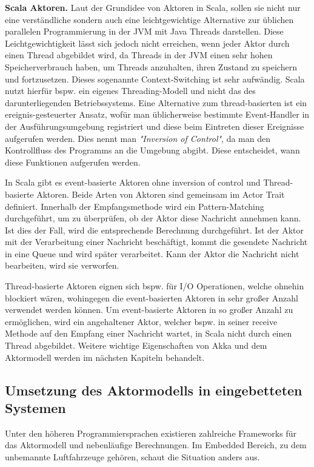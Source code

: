 \textbf{Scala Aktoren.} Laut der Grundidee von Aktoren in Scala, sollen sie nicht nur eine verständliche sondern auch eine leichtgewichtige Alternative zur üblichen parallelen Programmierung in der JVM mit Java Threads darstellen. Diese Leichtgewichtigkeit lässt sich jedoch nicht erreichen, wenn jeder Aktor durch einen Thread abgebildet wird, da Threads in der JVM einen sehr hohen Speicherverbrauch haben, um Threads anzuhalten, ihren Zustand zu speichern und fortzusetzen. Dieses sogenannte Context-Switching ist sehr aufwändig. Scala nutzt hierfür bspw. ein eigenes Threading-Modell und nicht das des darunterliegenden Betriebssystems. Eine Alternative zum thread-basierten ist ein ereignis-gesteuerter Ansatz, wofür man üblicherweise bestimmte Event-Handler in der Ausführungsumgebung registriert und diese beim Eintreten dieser Ereignisse aufgerufen werden. Dies nennt man \textit{"Inversion of Control"}, da man den Kontrollfluss des Programms an die Umgebung abgibt. Diese entscheidet, wann diese Funktionen aufgerufen werden.

In Scala gibt es event-basierte Aktoren ohne inversion of control und Thread-basierte Aktoren. Beide Arten von Aktoren sind gemeinsam im Actor Trait definiert. Innerhalb der Empfangsmethode wird ein Pattern-Matching durchgeführt, um zu überprüfen, ob der Aktor diese Nachricht annehmen kann. Ist dies der Fall, wird die entsprechende Berechnung durchgeführt. Ist der Aktor mit der Verarbeitung einer Nachricht beschäftigt, kommt die gesendete Nachricht in eine Queue und wird später verarbeitet. Kann der Aktor die Nachricht nicht bearbeiten, wird sie verworfen.

Thread-basierte Aktoren eignen sich bspw. für I/O Operationen, welche ohnehin blockiert wären, wohingegen die event-basierten Aktoren in sehr großer Anzahl verwendet werden können. Um event-basierte Aktoren in so großer Anzahl zu ermöglichen, wird ein angehaltener Aktor, welcher bspw. in seiner receive Methode auf den Empfang einer Nachricht wartet, in Scala nicht durch einen Thread abgebildet. Weitere wichtige Eigenschaften von Akka und dem Aktormodell werden im nächsten Kapiteln behandelt.

\subsection{Umsetzung des Aktormodells in eingebetteten Systemen}

Unter den höheren Programmiersprachen existieren zahlreiche Frameworks für das Aktormodell und nebenläufige Berechnungen. Im Embedded Bereich, zu dem unbemannte Luftfahrzeuge gehören, schaut die Situation anders aus.

